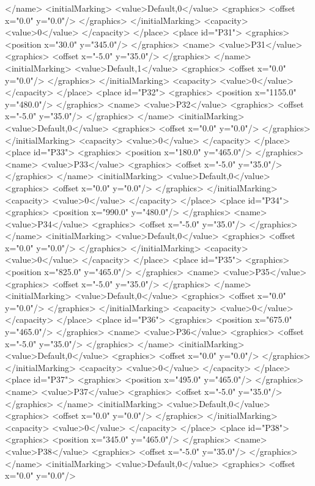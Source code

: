 </name>
<initialMarking>
<value>Default,0</value>
<graphics>
<offset x="0.0" y="0.0"/>
</graphics>
</initialMarking>
<capacity>
<value>0</value>
</capacity>
</place>
<place id="P31">
<graphics>
<position x="30.0" y="345.0"/>
</graphics>
<name>
<value>P31</value>
<graphics>
<offset x="-5.0" y="35.0"/>
</graphics>
</name>
<initialMarking>
<value>Default,1</value>
<graphics>
<offset x="0.0" y="0.0"/>
</graphics>
</initialMarking>
<capacity>
<value>0</value>
</capacity>
</place>
<place id="P32">
<graphics>
<position x="1155.0" y="480.0"/>
</graphics>
<name>
<value>P32</value>
<graphics>
<offset x="-5.0" y="35.0"/>
</graphics>
</name>
<initialMarking>
<value>Default,0</value>
<graphics>
<offset x="0.0" y="0.0"/>
</graphics>
</initialMarking>
<capacity>
<value>0</value>
</capacity>
</place>
<place id="P33">
<graphics>
<position x="180.0" y="465.0"/>
</graphics>
<name>
<value>P33</value>
<graphics>
<offset x="-5.0" y="35.0"/>
</graphics>
</name>
<initialMarking>
<value>Default,0</value>
<graphics>
<offset x="0.0" y="0.0"/>
</graphics>
</initialMarking>
<capacity>
<value>0</value>
</capacity>
</place>
<place id="P34">
<graphics>
<position x="990.0" y="480.0"/>
</graphics>
<name>
<value>P34</value>
<graphics>
<offset x="-5.0" y="35.0"/>
</graphics>
</name>
<initialMarking>
<value>Default,0</value>
<graphics>
<offset x="0.0" y="0.0"/>
</graphics>
</initialMarking>
<capacity>
<value>0</value>
</capacity>
</place>
<place id="P35">
<graphics>
<position x="825.0" y="465.0"/>
</graphics>
<name>
<value>P35</value>
<graphics>
<offset x="-5.0" y="35.0"/>
</graphics>
</name>
<initialMarking>
<value>Default,0</value>
<graphics>
<offset x="0.0" y="0.0"/>
</graphics>
</initialMarking>
<capacity>
<value>0</value>
</capacity>
</place>
<place id="P36">
<graphics>
<position x="675.0" y="465.0"/>
</graphics>
<name>
<value>P36</value>
<graphics>
<offset x="-5.0" y="35.0"/>
</graphics>
</name>
<initialMarking>
<value>Default,0</value>
<graphics>
<offset x="0.0" y="0.0"/>
</graphics>
</initialMarking>
<capacity>
<value>0</value>
</capacity>
</place>
<place id="P37">
<graphics>
<position x="495.0" y="465.0"/>
</graphics>
<name>
<value>P37</value>
<graphics>
<offset x="-5.0" y="35.0"/>
</graphics>
</name>
<initialMarking>
<value>Default,0</value>
<graphics>
<offset x="0.0" y="0.0"/>
</graphics>
</initialMarking>
<capacity>
<value>0</value>
</capacity>
</place>
<place id="P38">
<graphics>
<position x="345.0" y="465.0"/>
</graphics>
<name>
<value>P38</value>
<graphics>
<offset x="-5.0" y="35.0"/>
</graphics>
</name>
<initialMarking>
<value>Default,0</value>
<graphics>
<offset x="0.0" y="0.0"/>
